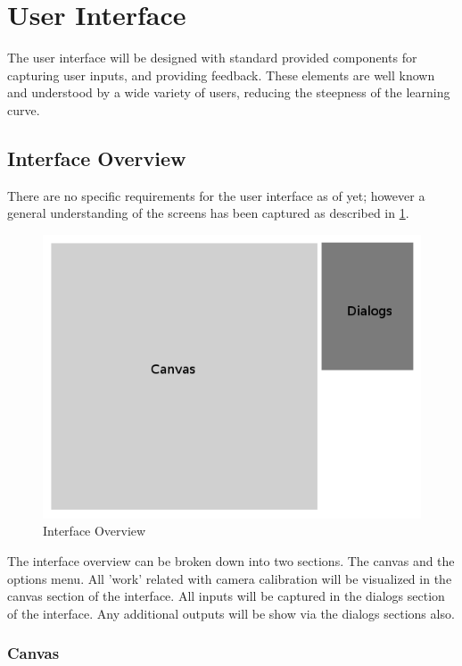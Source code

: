 \documentclass[11pt]{report}
\begin{document}
\section{User Interface} 

The user interface will be designed with standard  provided components for capturing user inputs, and providing feedback. These elements are well known and understood by a wide variety of users, reducing the steepness of the learning curve.

\subsection{Interface Overview}

There are no specific requirements for the user interface as of yet; however a general understanding of the screens has been captured as described in \ref{fig:is}. 

\begin{figure}[htp]
\centering
\includegraphics[scale=0.45]{images/interface_screen.png}
\caption{Interface Overview}
\label{fig:is}
\end{figure}

The interface overview can be broken down into two sections. The canvas and the options menu. All 'work' related with camera calibration will be visualized in the canvas section of the interface. All inputs will be captured in the dialogs section of the interface. Any additional outputs will be show via the dialogs sections also.

\subsubsection{Canvas}
\end{document}
